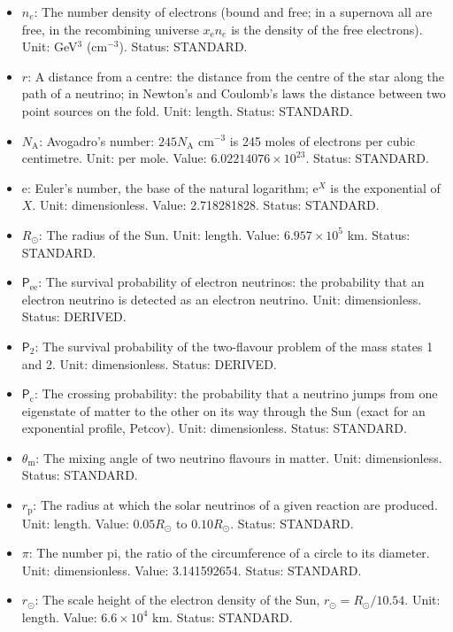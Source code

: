\documentclass[
  10pt,
]{article}
\begin{document}
\begin{itemize}
  exchange). Unit: GeV. Status: STANDARD.
\item
  \(n_e\): The number density of electrons (bound and free; in a
  supernova all are free, in the recombining universe
  \(x_{\mathrm{e}}n_e\) is the density of the free electrons). Unit:
  GeV\(^3\) (cm\(^{-3}\)). Status: STANDARD.
\item
  \(r\): A distance from a centre: the distance from the centre of the
  star along the path of a neutrino; in Newton's and Coulomb's laws the
  distance between two point sources on the fold. Unit: length. Status:
  STANDARD.
\item
  \(N_{\mathrm{A}}\): Avogadro's number: \(245N_{\mathrm{A}}\)
  cm\(^{-3}\) is 245 moles of electrons per cubic centimetre. Unit: per
  mole. Value: \(6.02214076\times10^{23}\). Status: STANDARD.
\item
  \(\mathrm{e}\): Euler's number, the base of the natural logarithm;
  \(\mathrm{e}^{X}\) is the exponential of \(X\). Unit: dimensionless.
  Value: 2.718281828. Status: STANDARD.
\item
  \(R_\odot\): The radius of the Sun. Unit: length. Value:
  \(6.957\times10^5\) km. Status: STANDARD.
\item
  \(\mathsf{P}_{\mathrm{ee}}\): The survival probability of electron
  neutrinos: the probability that an electron neutrino is detected as an
  electron neutrino. Unit: dimensionless. Status: DERIVED.
\item
  \(\mathsf{P}_{2}\): The survival probability of the two-flavour
  problem of the mass states 1 and 2. Unit: dimensionless. Status:
  DERIVED.
\item
  \(\mathsf{P}_{\mathrm{c}}\): The crossing probability: the probability
  that a neutrino jumps from one eigenstate of matter to the other on
  its way through the Sun (exact for an exponential profile, Petcov).
  Unit: dimensionless. Status: STANDARD.
\item
  \(\theta_{\mathrm{m}}\): The mixing angle of two neutrino flavours in
  matter. Unit: dimensionless. Status: STANDARD.
\item
  \(r_{\mathrm{p}}\): The radius at which the solar neutrinos of a given
  reaction are produced. Unit: length. Value: \(0.05R_\odot\) to
  \(0.10R_\odot\). Status: STANDARD.
\item
  \(\pi\): The number pi, the ratio of the circumference of a circle to
  its diameter. Unit: dimensionless. Value: 3.141592654. Status:
  STANDARD.
\item
  \(r_\odot\): The scale height of the electron density of the Sun,
  \(r_\odot = R_\odot/10.54\). Unit: length. Value: \(6.6\times10^4\)
  km. Status: STANDARD.
\end{itemize}
\end{document}
